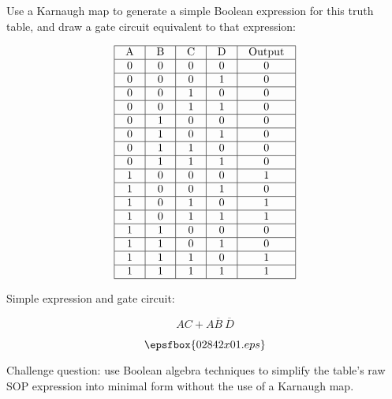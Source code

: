 

Use a Karnaugh map to generate a simple Boolean expression for this truth table, and draw a gate circuit equivalent to that expression:


$$\vbox{\offinterlineskip
\halign{\strut
\vrule \quad\hfil # \ \hfil & 
\vrule \quad\hfil # \ \hfil & 
\vrule \quad\hfil # \ \hfil & 
\vrule \quad\hfil # \ \hfil & 
\vrule \quad\hfil # \ \hfil \vrule \cr
\noalign{\hrule}
%
A & B & C & D & Output \cr
%
\noalign{\hrule}
%
0 & 0 & 0 & 0 & 0 \cr
%
\noalign{\hrule}
%
0 & 0 & 0 & 1 & 0 \cr
%
\noalign{\hrule}
%
0 & 0 & 1 & 0 & 0 \cr
%
\noalign{\hrule}
%
0 & 0 & 1 & 1 & 0 \cr
%
\noalign{\hrule}
%
0 & 1 & 0 & 0 & 0 \cr
%
\noalign{\hrule}
%
0 & 1 & 0 & 1 & 0 \cr
%
\noalign{\hrule}
%
0 & 1 & 1 & 0 & 0 \cr
%
\noalign{\hrule}
%
0 & 1 & 1 & 1 & 0 \cr
%
\noalign{\hrule}
%
1 & 0 & 0 & 0 & 1 \cr
%
\noalign{\hrule}
%
1 & 0 & 0 & 1 & 0 \cr
%
\noalign{\hrule}
%
1 & 0 & 1 & 0 & 1 \cr
%
\noalign{\hrule}
%
1 & 0 & 1 & 1 & 1 \cr
%
\noalign{\hrule}
%
1 & 1 & 0 & 0 & 0 \cr
%
\noalign{\hrule}
%
1 & 1 & 0 & 1 & 0 \cr
%
\noalign{\hrule}
%
1 & 1 & 1 & 0 & 1 \cr
%
\noalign{\hrule}
%
1 & 1 & 1 & 1 & 1 \cr
%
\noalign{\hrule}
} %
}$$ %







Simple expression and gate circuit:

$$AC + A\overline{B} \> \overline{D}$$

$$\epsfbox{02842x01.eps}$$

\vskip 10pt

Challenge question: use Boolean algebra techniques to simplify the table's raw SOP expression into minimal form without the use of a Karnaugh map.






